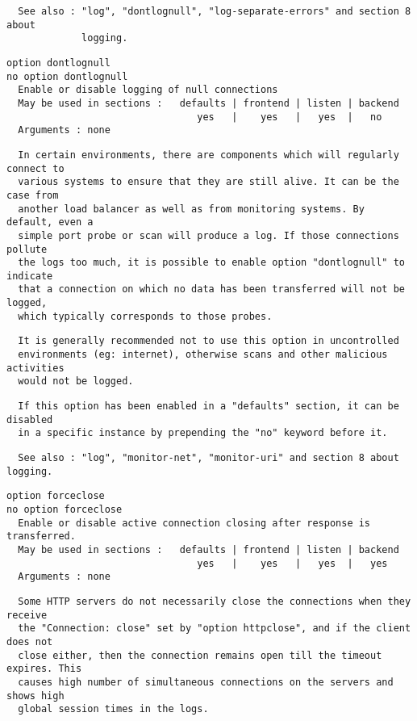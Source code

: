 \begin{verbatim}
  See also : "log", "dontlognull", "log-separate-errors" and section 8 about
             logging.
\end{verbatim}

\begin{verbatim}
option dontlognull
no option dontlognull
  Enable or disable logging of null connections
  May be used in sections :   defaults | frontend | listen | backend
                                 yes   |    yes   |   yes  |   no
  Arguments : none
\end{verbatim}

\begin{verbatim}
  In certain environments, there are components which will regularly connect to
  various systems to ensure that they are still alive. It can be the case from
  another load balancer as well as from monitoring systems. By default, even a
  simple port probe or scan will produce a log. If those connections pollute
  the logs too much, it is possible to enable option "dontlognull" to indicate
  that a connection on which no data has been transferred will not be logged,
  which typically corresponds to those probes.
\end{verbatim}

\begin{verbatim}
  It is generally recommended not to use this option in uncontrolled
  environments (eg: internet), otherwise scans and other malicious activities
  would not be logged.
\end{verbatim}

\begin{verbatim}
  If this option has been enabled in a "defaults" section, it can be disabled
  in a specific instance by prepending the "no" keyword before it.
\end{verbatim}

\begin{verbatim}
  See also : "log", "monitor-net", "monitor-uri" and section 8 about logging.
\end{verbatim}

\begin{verbatim}
option forceclose
no option forceclose
  Enable or disable active connection closing after response is transferred.
  May be used in sections :   defaults | frontend | listen | backend
                                 yes   |    yes   |   yes  |   yes
  Arguments : none
\end{verbatim}

\begin{verbatim}
  Some HTTP servers do not necessarily close the connections when they receive
  the "Connection: close" set by "option httpclose", and if the client does not
  close either, then the connection remains open till the timeout expires. This
  causes high number of simultaneous connections on the servers and shows high
  global session times in the logs.
\end{verbatim}

